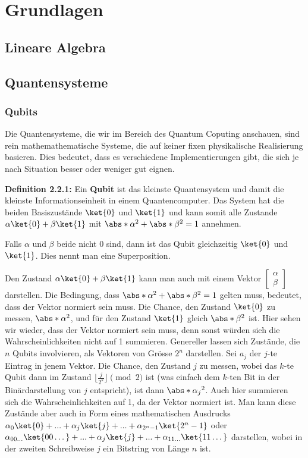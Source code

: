 \chapter{Grundlagen}
\section{Lineare Algebra}

\section{Quantensysteme}
\subsection{Qubits}
Die Quantensysteme, die wir im Bereich des Quantum Coputing anschauen, sind rein mathemathematische Systeme, die auf keiner fixen physikalische Realisierung basieren. Dies bedeutet, dass es verschiedene Implementierungen gibt, die sich je nach Situation besser oder weniger gut eignen.

\textbf{Definition 2.2.1:} Ein \textbf{Qubit} ist das kleinste Quantensystem und damit die kleinste Informationseinheit in einem Quantencomputer. Das System hat die beiden Basiszustände $\ket{0}$ und $\ket{1}$ und kann somit alle Zustande $\alpha\ket{0} + \beta\ket{1}$ mit $\abs*{\alpha}^2 + \abs*{\beta}^2 = 1$ annehmen.

Falls $\alpha$ und $\beta$ beide nicht 0 sind, dann ist das Qubit gleichzeitig $\ket{0}$ und $\ket{1}$. Dies nennt man eine Superposition. 

Den Zustand $\alpha\ket{0} + \beta\ket{1}$ kann man auch mit einem Vektor $\begin{bmatrix}\alpha \\ \beta\end{bmatrix}$ darstellen. Die Bedingung, dass $\abs*{\alpha}^2 + \abs*{\beta}^2 = 1$ gelten muss, bedeutet, dass der Vektor normiert sein muss. Die Chance, den Zustand $\ket{0}$ zu messen, $\abs*{\alpha}^2$, und für den Zustand $\ket{1}$ gleich $\abs*{\beta}^2$ ist. Hier sehen wir wieder, dass der Vektor normiert sein muss, denn sonst würden sich die Wahrscheinlichkeiten nicht auf 1 summieren.
Genereller lassen sich Zustände, die $n$ Qubits involvieren, als Vektoren von Grösse $2^n$ darstellen. Sei $a_j$ der $j$-te Eintrag in jenem Vektor. Die Chance, den Zustand $j$ zu messen, wobei das $k$-te Qubit dann im Zustand $\lfloor \frac{j}{2^k} \rfloor \pmod{2}$ ist (was einfach dem $k$-ten Bit in der Binärdarstellung von $j$ entspricht), ist dann $\abs*{\alpha_j}^2$. Auch hier summieren sich die Wahrscheinlichkeiten auf 1, da der Vektor normiert ist. Man kann diese Zustände aber auch in Form eines mathematischen Ausdrucks $\alpha_0\ket{0} + ... + \alpha_j\ket{j} + ... + \alpha_{2^n - 1}\ket{2^n - 1}$ oder $\alpha_{00\dots}\ket{00\dots} + ... + \alpha_{j}\ket{j} + ... + \alpha_{11\dots}\ket{11\dots}$ darstellen, wobei in der zweiten Schreibweise $j$ ein Bitstring von Länge $n$ ist.

